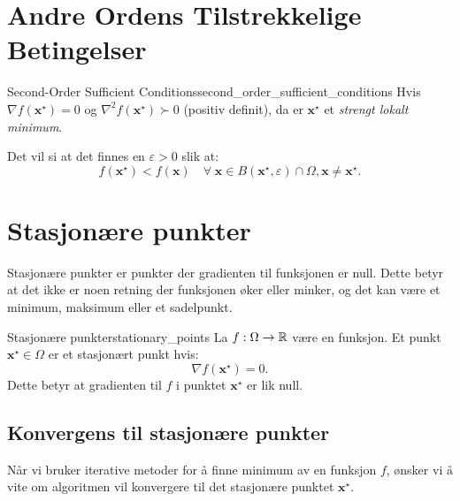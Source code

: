 \section{Andre Ordens Tilstrekkelige Betingelser}

\begin{theorem}{Second-Order Sufficient Conditions}{second_order_sufficient_conditions}
	Hvis \(\nabla f(\mathbf{x}^\star) = 0\) og \(\nabla^2 f(\mathbf{x}^\star) \succ 0\) (positiv definit), da er \(\mathbf{x}^\star\) et \emph{strengt lokalt minimum}.

	\medskip

	Det vil si at det finnes en \(\varepsilon > 0\) slik at:
	\[
		f(\mathbf{x}^\star) < f(\mathbf{x})  \quad \forall \; \mathbf{x} \in B(\mathbf{x}^\star, \varepsilon) \cap \Omega, \mathbf{x} \neq \mathbf{x}^\star.
	\]
\end{theorem}

\section{Stasjonære punkter}
Stasjonære punkter er punkter der gradienten til funksjonen er null. Dette betyr at det ikke er noen retning der funksjonen øker eller minker, og det kan være et minimum, maksimum eller et sadelpunkt.

\begin{definition}{Stasjonære punkter}{stationary_points}
	La \(f: \Omega \to \mathbb{R}\) være en funksjon. Et punkt \(\symbf{x}^\star \in \Omega\) er et stasjonært punkt hvis:
	\[
		\nabla f(\symbf{x}^\star) = 0.
	\]
	Dette betyr at gradienten til \(f\) i punktet \(\symbf{x}^\star\) er lik null.
\end{definition}

\subsection{Konvergens til stasjonære punkter}
Når vi bruker iterative metoder for å finne minimum av en funksjon \(f\), ønsker vi å vite om algoritmen vil konvergere til det stasjonære punktet \(\symbf{x}^\star\).

